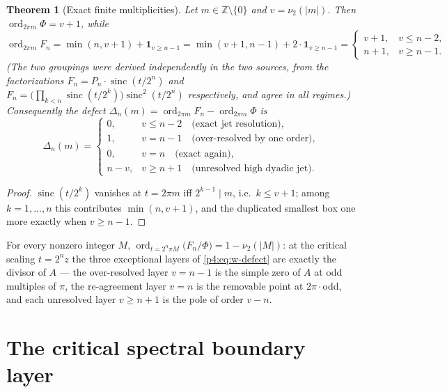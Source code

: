 \documentclass[11pt,oneside]{article}
\numberwithin{equation}{section}
\newtheorem{theorem}{Theorem}[section]
\theoremstyle{definition}
\theoremstyle{remark}
\newcommand{\Z}{\mathbb Z}
\newcommand{\sinc}{\operatorname{sinc}}
\newcommand{\ord}{\operatorname{ord}}
\newcommand{\vtwo}{\nu_2}
\begin{document}
\begin{theorem}[Exact finite multiplicities]
\label{p4:thm:w-filtration}
Let $m\in\Z\setminus\{0\}$ and $v=\vtwo(|m|)$.  Then
$\ord_{2\pi m}\Phi=v+1$, while
\begin{equation}
 \ord_{2\pi m}F_n
 =\min(n,v+1)+\mathbf 1_{v\ge n-1}
 =\min(v+1,n-1)+2\cdot\mathbf 1_{v\ge n-1}
 =\begin{cases}
 v+1,&v\le n-2,\\
 n+1,&v\ge n-1.
 \end{cases}
 \label{p4:eq:w-finite-order}
\end{equation}
(The two groupings were derived independently in the two sources, from the
factorizations $F_n=P_n\cdot\sinc(t/2^n)$ and
$F_n=\bigl(\prod_{k<n}\sinc(t/2^k)\bigr)\sinc^2(t/2^n)$ respectively, and
agree in all regimes.)
Consequently the defect
$\Delta_n(m)=\ord_{2\pi m}F_n-\ord_{2\pi m}\Phi$ is
\begin{equation}
 \Delta_n(m)=
 \begin{cases}
 0,&v\le n-2 \quad\text{(exact jet resolution)},\\
 1,&v=n-1 \quad\text{(over-resolved by one order)},\\
 0,&v=n \quad\text{(exact again)},\\
 n-v,&v\ge n+1 \quad\text{(unresolved high dyadic jet)}.
 \end{cases}
 \label{p4:eq:w-defect}
\end{equation}
\end{theorem}

\begin{proof}
$\sinc(t/2^k)$ vanishes at $t=2\pi m$ iff $2^{k-1}\mid m$, i.e.\
$k\le v+1$; among $k=1,\dots,n$ this contributes $\min(n,v+1)$, and the
duplicated smallest box one more exactly when $v\ge n-1$.
\end{proof}

\begin{corollary}
\label{p4:cor:w-realization}
For every nonzero integer $M$,
$\ord_{t=2^n\pi M}\bigl(F_n/\Phi\bigr)=1-\vtwo(|M|)$: at the critical
scaling $t=2^nz$ the three exceptional layers of \eqref{p4:eq:w-defect} are
exactly the divisor of $A$ --- the over-resolved layer $v=n-1$ is the simple
zero of $A$ at odd multiples of $\pi$, the re-agreement layer $v=n$ is the
removable point at $2\pi\cdot$odd, and each unresolved layer $v\ge n+1$ is
the pole of order $v-n$.
\end{corollary}

\section{The critical spectral boundary layer}
\label{p4:sec:w-critical}
\end{document}
